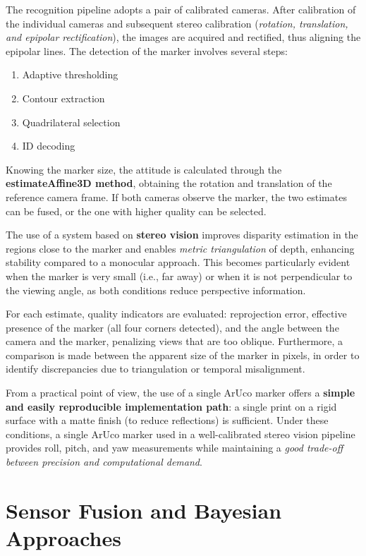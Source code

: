 The recognition pipeline adopts a pair of calibrated cameras. After calibration of the individual cameras and subsequent stereo calibration (\textit{rotation, translation, and epipolar rectification}), the images are acquired and rectified, thus aligning the epipolar lines. The detection of the marker involves several steps:

\begin{enumerate}
    \item Adaptive thresholding
    \item Contour extraction
    \item Quadrilateral selection
    \item ID decoding
\end{enumerate}

Knowing the marker size, the attitude is calculated through the \textbf{estimateAffine3D method}, obtaining the rotation and translation of the reference camera frame. If both cameras observe the marker, the two estimates can be fused, or the one with higher quality can be selected.

The use of a system based on \textbf{stereo vision} improves disparity estimation in the regions close to the marker and enables \textit{metric triangulation} of depth, enhancing stability compared to a monocular approach. This becomes particularly evident when the marker is very small (i.e., far away) or when it is not perpendicular to the viewing angle, as both conditions reduce perspective information.

For each estimate, quality indicators are evaluated: reprojection error, effective presence of the marker (all four corners detected), and the angle between the camera and the marker, penalizing views that are too oblique. Furthermore, a comparison is made between the apparent size of the marker in pixels, in order to identify discrepancies due to triangulation or temporal misalignment.

From a practical point of view, the use of a single ArUco marker offers a \textbf{simple and easily reproducible implementation path}: a single print on a rigid surface with a matte finish (to reduce reflections) is sufficient. Under these conditions, a single ArUco marker used in a well-calibrated stereo vision pipeline provides roll, pitch, and yaw measurements while maintaining a \textit{good trade-off between precision and computational demand}.
\section{Sensor Fusion and Bayesian Approaches}

